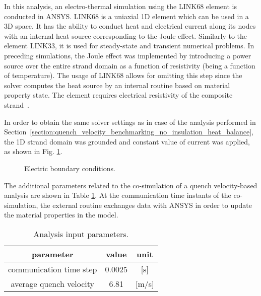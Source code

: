 
In this analysis, an electro-thermal simulation using the LINK68 element is conducted in ANSYS. LINK68 is a uniaxial 1D element which can be used in a 3D space. It has the ability to conduct heat and electrical current along its nodes with an internal heat source corresponding to the Joule effect. Similarly to the element LINK33, it is used for steady-state and transient numerical problems. In preceding simulations, the Joule effect was implemented by introducing a power source over the entire strand domain as a function of resistivity (being a function of temperature). The usage of LINK68 allows for omitting this step since the solver computes the heat source by an internal routine based on material property state. The element requires electrical resistivity of the composite strand~\cite{ansys_element_manual}.

In order to obtain the same solver settings as in case of the analysis performed in Section~\ref{section:quench_velocity_benchmarking_no_insulation_heat_balance}, the 1D strand domain was grounded and constant value of current was applied, as shown in Fig. \ref{fig: q_vel_benchmarking_electrical_settings}.

\begin{figure}[H]
\centering
{}
\caption{Electric boundary conditions.}
\label{fig: q_vel_benchmarking_electrical_settings}
\end{figure}

The additional parameters related to the co-simulation of a quench velocity-based analysis are shown in Table \ref{table: 1d_qv_benchmarking_geometry_parameters_quench_velocity}. At the communication time instants of the co-simulation, the external routine exchanges data with ANSYS in order to update the material properties in the model. 

\begin{table}[H]
    \caption{Analysis input parameters.} 
    \vspace{-1.em} 
    \fontsize{10}{10}
    \selectfont 
    \renewcommand{\arraystretch}{1.5}
    \begin{center}
        \begin{tabular}{ ccc }  
        \hline
        parameter & value & unit \\
        \hline
        communication time step & 0.0025 & [s] \\
        average quench velocity & 6.81 & [m/s] \\
        \hline 
        \end{tabular}
    \end{center}  
     \label{table: 1d_qv_benchmarking_geometry_parameters_quench_velocity} 
 \end{table}


